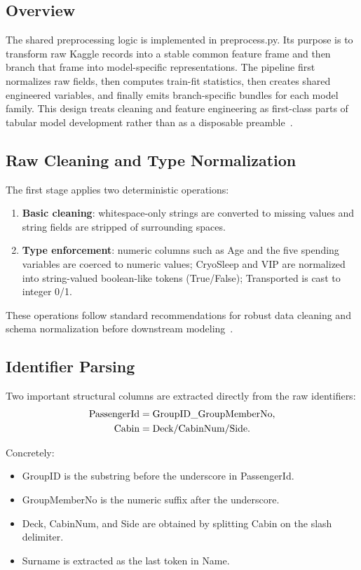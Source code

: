 \documentclass[conference]{IEEEtran}
\renewcommand{\texttt}[1]{\textnormal{#1}}
\begin{document}
\subsection{Overview}
The shared preprocessing logic is implemented in \texttt{preprocess.py}. Its purpose is to transform raw Kaggle records into a stable common feature frame and then branch that frame into model-specific representations. The pipeline first normalizes raw fields, then computes train-fit statistics, then creates shared engineered variables, and finally emits branch-specific bundles for each model family. This design treats cleaning and feature engineering as first-class parts of tabular model development rather than as a disposable preamble~\cite{chicco2022tips,tschalzev2024datacentric}.

\subsection{Raw Cleaning and Type Normalization}
The first stage applies two deterministic operations:
\begin{enumerate}
\item \textbf{Basic cleaning}: whitespace-only strings are converted to missing values and string fields are stripped of surrounding spaces.
\item \textbf{Type enforcement}: numeric columns such as \texttt{Age} and the five spending variables are coerced to numeric values; \texttt{CryoSleep} and \texttt{VIP} are normalized into string-valued boolean-like tokens (\texttt{True}/\texttt{False}); \texttt{Transported} is cast to integer 0/1.
\end{enumerate}
These operations follow standard recommendations for robust data cleaning and schema normalization before downstream modeling~\cite{chicco2022tips}.

\subsection{Identifier Parsing}
Two important structural columns are extracted directly from the raw identifiers:
\begin{align}
\texttt{PassengerId} &= \texttt{GroupID}\_\texttt{GroupMemberNo},\\
\texttt{Cabin} &= \texttt{Deck}/\texttt{CabinNum}/\texttt{Side}.
\end{align}

Concretely:
\begin{itemize}
\item \texttt{GroupID} is the substring before the underscore in \texttt{PassengerId}.
\item \texttt{GroupMemberNo} is the numeric suffix after the underscore.
\item \texttt{Deck}, \texttt{CabinNum}, and \texttt{Side} are obtained by splitting \texttt{Cabin} on the slash delimiter.
\item \texttt{Surname} is extracted as the last token in \texttt{Name}.
\end{itemize}
\end{document}
